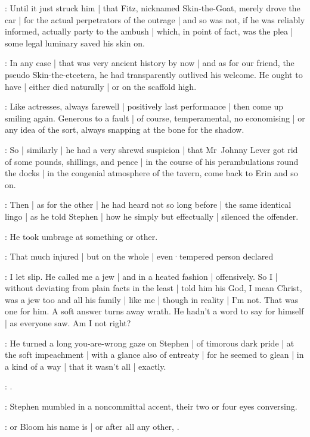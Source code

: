 :
Until it just struck him |
that Fitz,
nicknamed Skin-the-Goat,
merely drove the car |
for the actual perpetrators of the outrage |
and so was not,
if he was reliably informed,
actually party to the ambush |
which,
in point of fact,
was the plea |
some legal luminary saved his skin on.

:
In any case |
that was very ancient history by now |
and as for our friend,
the pseudo Skin-the-etcetera,
he had transparently outlived his welcome.
He ought to have |
either died naturally |
or on the scaffold high.

:
Like actresses,
always farewell |
positively last performance |
then come up smiling again.
Generous to a fault |
of course,
temperamental,
no economising |
or any idea of the sort,
always snapping at the bone for the shadow.

:
So |
similarly |
he had a very shrewd suspicion |
that Mr~Johnny Lever got rid of some pounds,
shillings,
and pence |
in the course of his perambulations round the docks |
in the congenial atmosphere of the  tavern,
come back to Erin and so on.

:
Then |
as for the other |
he had heard not so long before |
the same identical lingo |
as he told Stephen |
how he simply but effectually |
silenced the offender.%

\Bloom:
He took umbrage at something or other.

:
That much injured |
but on the whole |
even·tempered person declared

\Bloom:
I let slip.
He called me a jew |
and in a heated fashion |
offensively.
So I |
without deviating from plain facts in the least |
told him his God,
I mean Christ,
was a jew too and all his family |
like me |
though in reality |
I'm not.
That was one for him.
A soft answer turns away wrath.
He hadn't a word to say for himself |
as everyone saw.
Am I not right?

:
He turned a long you-are-wrong gaze on Stephen |
of timorous dark pride |
at the soft impeachment |
with a glance also of entreaty |
for he seemed to glean |
in a kind of a way |
that it wasn't all |
exactly.%

\Stephen:
.

:
Stephen mumbled in a noncommittal accent,
their two or four eyes conversing.

\Stephen:
 or Bloom his name is |
or after all any other,
.

